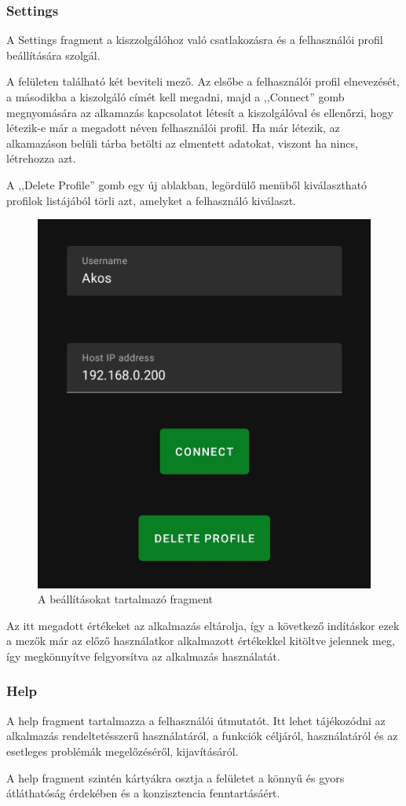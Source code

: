 \documentclass[
]{thesis-ekf}
\theoremstyle{definition}
\theoremstyle{remark}
\begin{document}
\subsubsection{Settings}
A Settings fragment a kiszzolgálóhoz való csatlakozásra és a felhasználói profil beállítására szolgál.

A felületen található két beviteli mező. Az elsőbe a felhasználói profil elnevezését, a másodikba a kiszolgáló címét
kell megadni, majd a ,,Connect'' gomb megnyomására az alkamazás kapcsolatot létesít a kiszolgálóval és ellenőrzi, hogy
létezik-e már a megadott néven felhasználói profil. Ha már létezik, az alkamazáson belüli tárba betölti az elmentett adatokat,
viszont ha nincs, létrehozza azt.

A ,,Delete Profile'' gomb egy új ablakban, legördülő menüből kiválasztható profilok listájából törli azt, amelyket a
felhasználó kiválaszt.
\begin{figure}[H]
	\centering
	\includegraphics[width=0.5\linewidth]{images/connect.jpg}
	\caption{A beállításokat tartalmazó fragment}
\end{figure}

Az itt megadott értékeket az alkalmazás eltárolja, így a következő indításkor ezek a mezők már az előző használatkor
alkalmazott értékekkel kitöltve jelennek meg, így megkönnyítve felgyorsítva az alkalmazás használatát.

\subsubsection{Help}
A help fragment tartalmazza a felhasználói útmutatót. Itt lehet tájékozódni az alkalmazás rendeltetésszerű használatáról,
a funkciók céljáról, használatáról és az esetleges problémák megelőzéséről, kijavításáról.

A help fragment szintén kártyákra osztja a felületet a könnyű és gyors átláthatóság érdekében és a
konzisztencia fenntartásáért.
\end{document}
